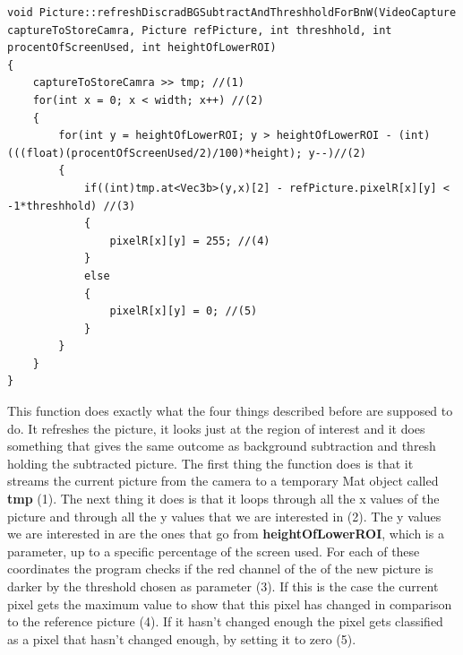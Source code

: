 \begin{lstlisting}
void Picture::refreshDiscradBGSubtractAndThreshholdForBnW(VideoCapture captureToStoreCamra, Picture refPicture, int threshhold, int procentOfScreenUsed, int heightOfLowerROI)
{
	captureToStoreCamra >> tmp; //(1)
	for(int x = 0; x < width; x++) //(2)
	{
		for(int y = heightOfLowerROI; y > heightOfLowerROI - (int)(((float)(procentOfScreenUsed/2)/100)*height); y--)//(2)
		{
			if((int)tmp.at<Vec3b>(y,x)[2] - refPicture.pixelR[x][y] < -1*threshhold) //(3)
			{
				pixelR[x][y] = 255; //(4)
			}
			else
			{
				pixelR[x][y] = 0; //(5)
			}
		}
	}
}
\end{lstlisting}
This function does exactly what the four things described before are supposed to do. It refreshes the picture, it looks just at the region of interest and it does something that gives the same outcome as background subtraction and thresh holding the subtracted picture.
The first thing the function does is that it streams the current picture from the camera to a temporary Mat object called \textbf{tmp} (1). The next thing it does is that it loops through all the x values of the picture and through all the y values that we are interested in (2). The y values we are interested in are the ones that go from \textbf{heightOfLowerROI}, which is a parameter, up to a specific percentage of the screen used. For each of these coordinates the program checks if the red channel of the of the new picture is darker by the threshold chosen as parameter (3). If this is the case the current pixel gets the maximum value to show that this pixel has changed in comparison to the reference picture (4). If it hasn't changed enough the pixel gets classified as a pixel that hasn't changed enough, by setting it to zero (5).


